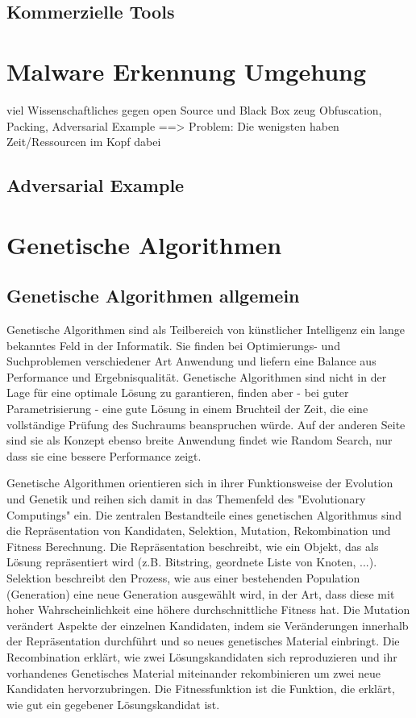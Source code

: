 \subsection{Kommerzielle Tools}

\section{Malware Erkennung Umgehung}
viel Wissenschaftliches gegen open Source und Black Box zeug
Obfuscation, Packing, Adversarial Example
==> Problem: Die wenigsten haben Zeit/Ressourcen im Kopf dabei

\subsection{Adversarial Example}
\label{ML-Evasion}
\section{Genetische Algorithmen}
\subsection{Genetische Algorithmen allgemein}
Genetische Algorithmen sind als Teilbereich von künstlicher Intelligenz ein lange bekanntes Feld in der Informatik. Sie finden bei Optimierungs- und Suchproblemen verschiedener Art Anwendung und liefern eine Balance aus Performance und Ergebnisqualität. Genetische Algorithmen sind nicht in der Lage für eine optimale Lösung zu garantieren, finden aber - bei guter Parametrisierung - eine gute Lösung in einem Bruchteil der Zeit, die eine vollständige Prüfung des Suchraums beanspruchen würde. Auf der anderen Seite sind sie als Konzept ebenso breite Anwendung findet wie Random Search, nur dass sie eine bessere Performance zeigt.

Genetische Algorithmen orientieren sich in ihrer Funktionsweise der Evolution und Genetik und reihen sich damit in das  Themenfeld des "Evolutionary Computings" ein.
Die zentralen Bestandteile eines genetischen Algorithmus sind die Repräsentation von Kandidaten, Selektion, Mutation, Rekombination und Fitness Berechnung. Die Repräsentation beschreibt, wie ein Objekt, das als Lösung repräsentiert wird (z.B. Bitstring, geordnete Liste von Knoten, ...). Selektion beschreibt den Prozess, wie aus einer bestehenden Population (Generation) eine neue Generation ausgewählt wird, in der Art, dass diese mit hoher Wahrscheinlichkeit eine höhere durchschnittliche Fitness hat. Die Mutation verändert Aspekte der einzelnen Kandidaten, indem sie Veränderungen innerhalb der Repräsentation durchführt und so neues genetisches Material einbringt. Die Recombination erklärt, wie zwei Lösungskandidaten sich reproduzieren und ihr vorhandenes Genetisches Material miteinander rekombinieren um zwei neue Kandidaten hervorzubringen. Die Fitnessfunktion ist die Funktion, die erklärt, wie gut ein gegebener Lösungskandidat ist.

